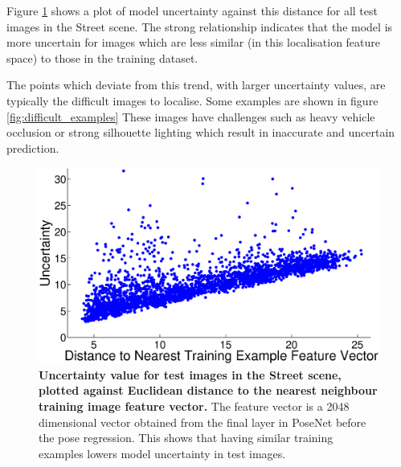 Figure \ref{fig:nn_vec_uncertainty} shows a plot of model uncertainty against this distance for all test images in the Street scene. The strong relationship indicates that the model is more uncertain for images which are less similar (in this localisation feature space) to those in the training dataset. 

The points which deviate from this trend, with larger uncertainty values, are typically the difficult images to localise. Some examples are shown in figure \ref{fig:difficult_examples} These images have challenges such as heavy vehicle occlusion or strong silhouette lighting which result in inaccurate and uncertain prediction.



\begin{figure}[t]
\begin{center}
   	\includegraphics[width=0.6\linewidth]{Uncertainty/nn_vector_uncertainty.eps}
\end{center}
   \caption[Plot of uncertainty against distance from training data for localisation]{\textbf{Uncertainty value for test images in the Street scene, plotted against Euclidean distance to the nearest neighbour training image feature vector.} The feature vector is a 2048 dimensional vector obtained from the final layer in PoseNet before the pose regression. This shows that having similar training examples lowers model uncertainty in test images.}
\label{fig:nn_vec_uncertainty}
\end{figure}

